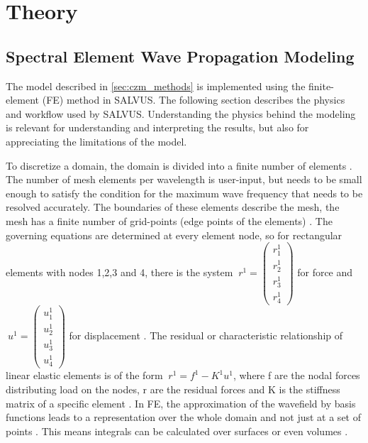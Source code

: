 \chapter{Theory}
\label{chap:theory}
%
%

\section{Spectral Element Wave Propagation Modeling}
\label{sec:salvus_method}

The model described in \ref{sec:czm_methods} is implemented using the finite-element (FE) method in SALVUS. The following section describes the physics and workflow used by SALVUS. Understanding the physics behind the modeling is relevant for understanding and interpreting the results, but also for appreciating the limitations of the model. \par

To discretize a domain, the domain is divided into a finite number of elements \parencite{FiniteElementMethod}. The number of mesh elements per wavelength is user-input, but needs to be small enough to satisfy the condition for the maximum wave frequency that needs to be resolved accurately. The boundaries of these elements describe the mesh, the mesh has a finite number of grid-points (edge points of the elements) \parencite{FiniteElementMethod}. The governing equations are determined at every element node, so for rectangular elements with nodes 1,2,3 and 4, there is the system $\ r^1 = \begin{pmatrix}r_1^1 \\ r_2^1 \\ r_3^1\\ r_4^1 \end{pmatrix}$ for force  and $\ u^1 = \begin{pmatrix}u_1^1 \\ u_2^1 \\ u_3^1\\ u_4^1 \end{pmatrix}$ for displacement \parencite{FiniteElementMethod}. The residual or characteristic relationship of linear elastic elements is of the form $\ r^1 = f^1-K^1u^1 $, where f are the nodal forces distributing load on the nodes, r are the residual forces and K is the stiffness matrix of a specific element \parencite{FiniteElementMethod}. In FE, the approximation of the wavefield by basis functions leads to a representation over the whole domain and not just at a set of points \parencite{afanasievModularFlexibleSpectralelement2019}. This means integrals can be calculated over surfaces or even volumes \parencite{afanasievModularFlexibleSpectralelement2019}. \par

